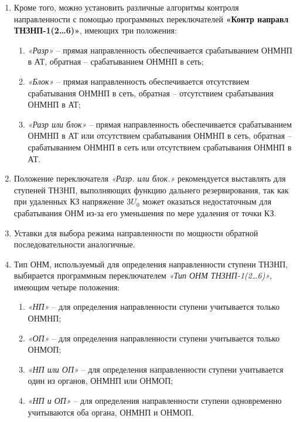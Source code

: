 \begin{enumerate}[label=\arabic{section}.\arabic{subsection}.\arabic*,  align=left, labelsep=4pt, leftmargin=0pt, itemindent=57pt]
\begin{enumerate}[label=\arabic*)]
    \item \textit{«Ненапр»} -- ступень выполнена ненаправленной;
    \item \textit{«В АТ»} -- ступень выполнена прямонаправленной в сторону АТ;
    \item \textit{«В сеть»} -- ступень выполнена обратнонаправленной в сторону сети.
\end{enumerate}

\item
Кроме того, можно установить различные алгоритмы контроля направленности с помощью программных
переключателей \textbf{«Контр направл ТНЗНП-1(2…6)»}, имеющих три положения:

\begin{enumerate}[label=\arabic*)]
    \item \textit{«Разр»} --  прямая направленность обеспечивается срабатыванием ОНМНП в АТ, обратная -- срабатыванием ОНМНП в сеть;
    \item \textit{«Блок»} -- прямая направленность обеспечивается отсутствием срабатывания ОНМНП в сеть, обратная -- отсутствием срабатывания ОНМНП в АТ;
    \item \textit{«Разр или блок»} -- прямая направленность обеспечивается срабатыванием ОНМНП в АТ или отсутствием срабатывания ОНМНП в сеть, обратная -- срабатыванием ОНМНП в сеть или отсутствием срабатывания ОНМНП в АТ.
\end{enumerate}

\item
Положение переключателя \textit{«Разр. или блок.»} рекомендуется выставлять для ступеней ТНЗНП,
выполняющих функцию дальнего резервирования, так как при удаленных КЗ напряжение $3U_0$ может оказаться
недостаточным для срабатывания ОНМ из-за его уменьшения по мере удаления от точки КЗ.

\item
Уставки для выбора режима направленности по мощности обратной последовательности аналогичные.

\item
Тип ОНМ, используемый для определения направленности ступени ТНЗНП, выбирается программным
переключателем \textit{«Тип ОНМ ТНЗНП-1(2…6)»}, имеющим четыре положения:

\begin{enumerate}[label=\arabic*)]
    \item \textit{«НП»} -- для определения направленности ступени учитывается только ОНМНП;
    \item \textit{«ОП»} -- для определения направленности ступени учитывается только ОНМОП;
    \item \textit{«НП или ОП»} -- для определения направленности ступени учитывается один из органов, ОНМНП или ОНМОП;
    \item \textit{«НП и ОП»} -- для определения направленности ступени одновременно учитываются оба органа, ОНМНП и ОНМОП.
\end{enumerate}


\end{enumerate}
